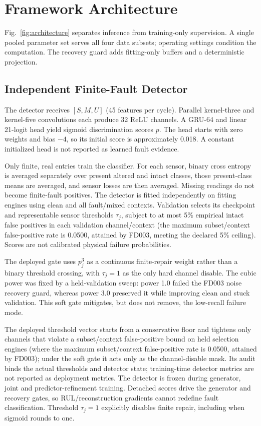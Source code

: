 \documentclass[conference]{IEEEtran}
\begin{document}
\section{\textbf{Framework Architecture}}
\label{sec:architecture}
Fig.~\ref{fig:architecture} separates inference from training-only supervision. A single pooled parameter set serves all four data subsets; operating settings condition the computation. The recovery guard adds fitting-only buffers and a deterministic projection.

\subsection{\textbf{Independent Finite-Fault Detector}}
The detector receives $[S,M,U]$ (45 features per cycle). Parallel kernel-three and kernel-five convolutions each produce 32 ReLU channels. A GRU-64 and linear 21-logit head yield sigmoid discrimination scores $p$. The head starts with zero weights and bias $-4$, so its initial score is approximately 0.018. A constant initialized head is not reported as learned fault evidence.

Only finite, real entries train the classifier. For each sensor, binary cross entropy is averaged separately over present altered and intact classes, those present-class means are averaged, and sensor losses are then averaged. Missing readings do not become finite-fault positives. The detector is fitted independently on fitting engines using clean and all fault/mixed contexts. Validation selects its checkpoint and representable sensor thresholds $\tau_j$, subject to at most 5\% empirical intact false positives in each validation channel/context (the maximum subset/context false-positive rate is 0.0500, attained by FD003, meeting the declared 5\% ceiling). Scores are not calibrated physical failure probabilities.

The deployed gate uses $p_j^3$ as a continuous finite-repair weight rather than a binary threshold crossing, with $\tau_j=1$ as the only hard channel disable. The cubic power was fixed by a held-validation sweep: power 1.0 failed the FD003 noise recovery guard, whereas power 3.0 preserved it while improving clean and stuck validation. This soft gate mitigates, but does not remove, the low-recall failure mode.

The deployed threshold vector starts from a conservative floor and tightens only
channels that violate a subset/context false-positive bound on held selection
engines (where the maximum subset/context false-positive rate is 0.0500, attained by FD003);
under the soft gate it acts only as the channel-disable mask. Its
audit binds the actual thresholds and detector state; training-time
detector metrics are not reported as deployment metrics. The detector is frozen during generator,
joint and predictor-refinement training. Detached scores drive the generator and
recovery gates, so RUL/reconstruction gradients cannot redefine fault
classification. Threshold $\tau_j=1$ explicitly disables finite repair, including
when sigmoid rounds to one.
\end{document}
